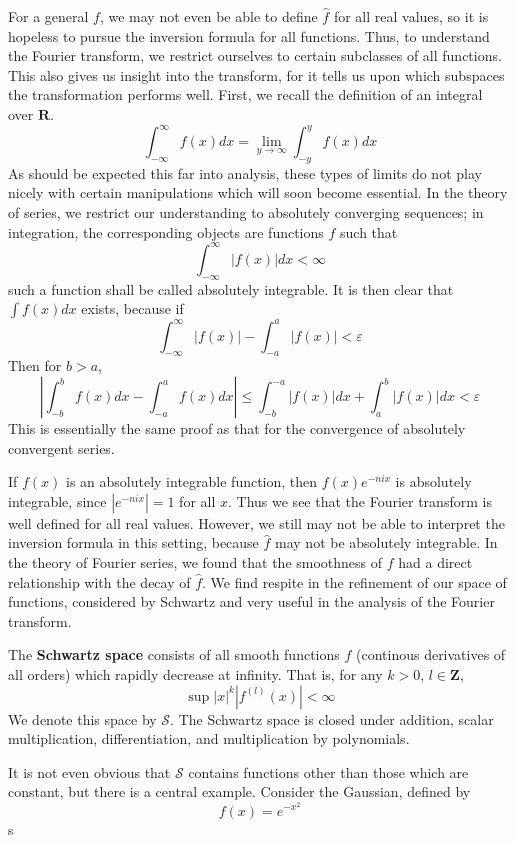 For a general $f$, we may not even be able to define $\widehat{f}$ for all real values, so it is hopeless to pursue the inversion formula for all functions. Thus, to understand the Fourier transform, we restrict ourselves to certain subclasses of all functions. This also gives us insight into the transform, for it tells us upon which subspaces the transformation performs well. First, we recall the definition of an integral over $\mathbf{R}$.
%
\[ \int_{-\infty}^\infty f(x) dx = \lim_{y \to \infty} \int_{-y}^y f(x) dx \]
%
As should be expected this far into analysis, these types of limits do not play nicely with certain manipulations which will soon become essential. In the theory of series, we restrict our understanding to absolutely converging sequences; in integration, the corresponding objects are functions $f$ such that
%
\[ \int_{-\infty}^\infty |f(x)| dx < \infty \]
%
such a function shall be called absolutely integrable. It is then clear that $\int f(x) dx$ exists, because if
%
\[ \int_{-\infty}^\infty |f(x)| - \int_{-a}^a |f(x)| < \varepsilon \]
%
Then for $b > a$,
%
\[ \left| \int_{-b}^b f(x) dx - \int_{-a}^a f(x) dx \right| \leq \int_{-b}^{-a} |f(x)| dx + \int_a^b |f(x)| dx < \varepsilon \]
%
This is essentially the same proof as that for the convergence of absolutely convergent series.

If $f(x)$ is an absolutely integrable function, then $f(x) e^{-nix}$ is absolutely integrable, since $|e^{-nix}| = 1$ for all $x$. Thus we see that the Fourier transform is well defined for all real values. However, we still may not be able to interpret the inversion formula in this setting, because $\widehat{f}$ may not be absolutely integrable. In the theory of Fourier series, we found that the smoothness of $f$ had a direct relationship with the decay of $\widehat{f}$. We find respite in the refinement of our space of functions, considered by Schwartz and very useful in the analysis of the Fourier transform.

The {\bf Schwartz space} consists of all smooth functions $f$ (continous derivatives of all orders) which rapidly decrease at infinity. That is, for any $k > 0$, $l \in \mathbf{Z}$,
%
\[ \sup |x|^k |f^{(l)}(x)| < \infty \]
%
We denote this space by $\mathcal{S}$. The Schwartz space is closed under addition, scalar multiplication, differentiation, and multiplication by polynomials.

It is not even obvious that $\mathcal{S}$ contains functions other than those which are constant, but there is a central example. Consider the Gaussian, defined by
%
\[ f(x) = e^{-x^2} \]
%
s

